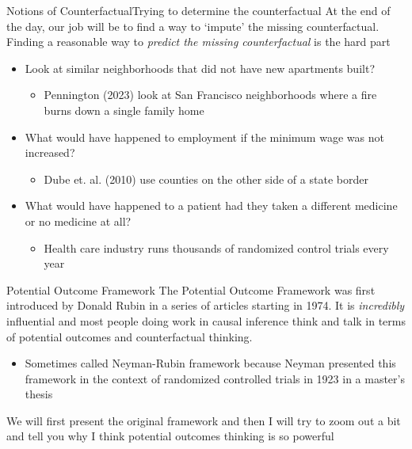 \documentclass[aspectratio=169,t,11pt,table]{beamer}
\begin{document}
\begin{frame}{Notions of Counterfactual}{Trying to determine the counterfactual}
  At the end of the day, our job will be to find a way to `impute' the missing counterfactual. Finding a reasonable way to \emph{predict the missing counterfactual} is the hard part

  \bigskip
  \begin{itemize}
    \item Look at similar neighborhoods that did not have new apartments  built? 
    \begin{itemize}
      \item Pennington (2023) look at San Francisco neighborhoods where a fire burns down a single family home
    \end{itemize}
    
    \pause
    \item What would have happened to employment if the minimum wage was not increased? 
    \begin{itemize}
      \item Dube et. al. (2010) use counties on the other side of a state border
    \end{itemize}
    
    \pause
    \item What would have happened to a patient had they taken a different medicine or no medicine at all?
    \begin{itemize}
      \item Health care industry runs thousands of randomized control trials every year
    \end{itemize} 
  \end{itemize}
\end{frame}

\begin{frame}{Potential Outcome Framework}
  The \alert{Potential Outcome Framework} was first introduced by Donald Rubin in a series of articles starting in 1974. It is \emph{incredibly} influential and most people doing work in causal inference think and talk in terms of potential outcomes and counterfactual thinking.
  \begin{itemize}
    \item Sometimes called Neyman-Rubin framework because Neyman presented this framework in the context of randomized controlled trials in 1923 in a master's thesis
  \end{itemize}

  \pause
  \bigskip
  We will first present the original framework and then I will try to zoom out a bit and tell you why I think potential outcomes thinking is so powerful
\end{frame}
\end{document}
